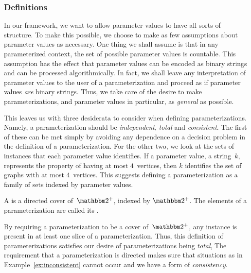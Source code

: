 \subsubsection{Definitions}
In our framework, we want to allow parameter values to have all sorts of structure.
To make this possible, we choose to make as few assumptions about parameter values as necessary.
One thing we shall assume is that in any parameterized context, the set of possible parameter values is countable.
This assumption has the effect that parameter values can be encoded as binary strings and can be processed algorithmically.
In fact, we shall leave any interpretation of parameter values to the user of a parameterization and proceed as if parameter values \emph{are} binary strings.
Thus, we take care of the desire to make parameterizations, and parameter values in particular, as \emph{general} as possible.

This leaves us with three desiderata to consider when defining parameterizations.
Namely, a parameterization should be \emph{independent}, \emph{total} and \emph{consistent}.
The first of these can be met simply by avoiding any dependence on a decision problem in the definition of a parameterization.
For the other two, we look at the sets of instances that each parameter value identifies.
If a parameter value, a string~$k$, represents the property of having at most $4$~vertices, then $k$ identifies the set of graphs with at most $4$~vertices.
This suggests defining a parameterization as a family of sets indexed by parameter values.
\begin{definition}
  A  is a directed cover of~$\binary^+$, indexed by $\binary^+$.
  The elements of a parameterization are called its .
\end{definition}

By requiring a parameterization to be a cover of~$\binary^+$, any instance is present in at least one slice of a parameterization.
Thus, this definition of parameterizations satisfies our desire of parameterizations being \emph{total},
The requirement that a parameterization is directed makes sure that situations as in Example~\ref{ex:inconsistent} cannot occur and we have a form of \emph{consistency}.

